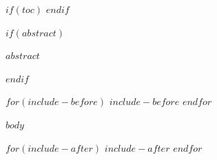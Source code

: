 \documentclass[11pt,a4paper]{article}
\begin{document}
\setcounter{page}{1}

$if(toc)$
{
\hypersetup{linkcolor=navy}
\renewcommand{\contentsname}{\textcolor{accent}{/}\ $if(toc-title)$$toc-title$$else$Índice$endif$}
\tableofcontents
}
\newpage
$endif$

$if(abstract)$
\begin{resumen}
$abstract$
\end{resumen}
$endif$

$for(include-before)$
$include-before$
$endfor$

$body$

$for(include-after)$
$include-after$
$endfor$
\end{document}
